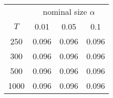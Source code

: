 % 
\begin{tabular}{cccc}
  \hline
  & \multicolumn{3}{c}{nominal size $\alpha$} \\
 $T$ & 0.01 & 0.05 & 0.1 \\
 \hline
250 & 0.096 & 0.096 & 0.096 \\ 
  300 & 0.096 & 0.096 & 0.096 \\ 
  500 & 0.096 & 0.096 & 0.096 \\ 
  1000 & 0.096 & 0.096 & 0.096 \\ 
   \hline
\end{tabular}
